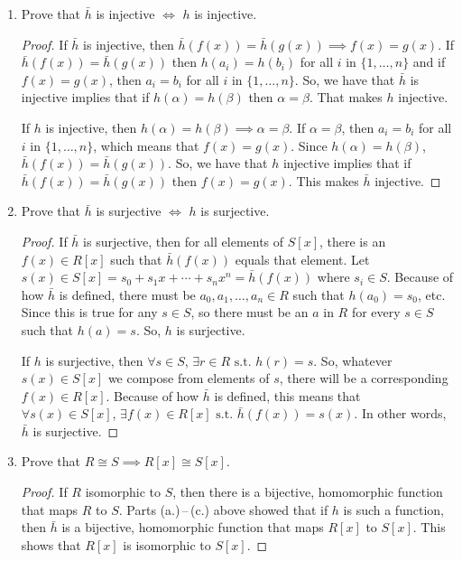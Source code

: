 \documentclass[12pt]{article}
\newcommand{\such}{\text{ s.t. }}
\begin{document}
\begin{itemize}
\begin{enumerate}[(a.)]
  \item Prove that $\bar{h}$ is injective $\iff$ $h$ is injective.
  \begin{proof}
    If $\bar{h}$ is injective, then $\bar{h}(f(x))=\bar{h}(g(x)) \implies f(x)=g(x)$.
    If $\bar{h}(f(x))=\bar{h}(g(x))$ then $h(a_i) = h(b_i)$ for all $i$ in $\{1,\dotsc,n\}$
    and if $f(x)=g(x)$, then $a_i = b_i$ for all $i$ in $\{1,\dotsc,n\}$.
    So, we have that $\bar{h}$ is injective implies that if $h(\alpha)=h(\beta)$ then $\alpha = \beta$.
    That makes $h$ injective.
    \par
    If $h$ is injective, then $h(\alpha)=h(\beta) \implies \alpha = \beta$.
    If $\alpha = \beta$, then $a_i = b_i$ for all $i$ in $\{1,\dotsc,n\}$, which means that $f(x)=g(x)$.
    Since $h(\alpha)=h(\beta)$, $\bar{h}(f(x))=\bar{h}(g(x))$.
    So, we have that $h$ injective implies that if $\bar{h}(f(x))=\bar{h}(g(x))$ then $f(x)=g(x)$.
    This makes $\bar{h}$ injective.
  \end{proof}

  \item Prove that $\bar{h}$ is surjective $\iff$ $h$ is surjective.
  \begin{proof}
    If $\bar{h}$ is surjective, then for all elements of $S[x]$, there is an $f(x) \in R[x]$ such that $\bar{h}(f(x))$ equals that element.
    Let $s(x) \in S[x] = s_0 + s_1 x + \dotsb + s_n x^n = \bar{h}(f(x))$ where $s_i \in S$.
    Because of how $\bar{h}$ is defined, there must be $a_0, a_1, \dotsc, a_n \in R$ such that $h(a_0) = s_0$, etc.
    Since this is true for any $s \in S$, so there must be an $a$ in $R$ for every $s \in S$ such that $h(a) = s$. So, $h$ is surjective.
    \par
    If $h$ is surjective, then $\forall s \in S$, $\exists r \in R \such h(r) = s$.
    So, whatever $s(x) \in S[x]$ we compose from elements of $s$, there will be a corresponding $f(x) \in R[x]$.
    Because of how $\bar{h}$ is defined, this means that $\forall s(x) \in S[x]$, $\exists f(x) \in R[x] \such \bar{h}(f(x)) = s(x)$.
    In other words, $\bar{h}$ is surjective.
  \end{proof}

  \item Prove that $R\cong S \implies R[x]\cong S[x]$.
  \begin{proof}
    If $R$ isomorphic to $S$, then there is a bijective, homomorphic function that maps $R$ to $S$.
    Parts (a.)\,--\,(c.) above showed that if $h$ is such a function, then $\bar{h}$ is a bijective, homomorphic function that maps $R[x]$ to $S[x]$.
    This shows that $R[x]$ is isomorphic to $S[x]$.
  \end{proof}
\end{enumerate}


\end{itemize}
\end{document}
